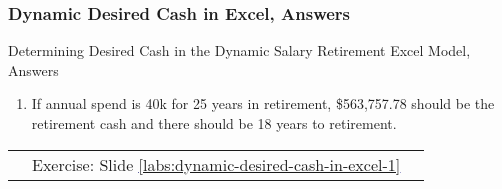 \documentclass[handout, 11pt]{beamer}
\begin{document}
\appendix
{}
\setcounter{finalframe}{\value{framenumber}}
\begin{frame}
\frametitle{Dynamic Desired Cash in Excel, Answers}
{
\begin{block}{Determining Desired Cash in the Dynamic Salary Retirement Excel Model, Answers}
\begin{enumerate}
\item If annual spend is 40k for 25 years in retirement, \$563,757.78 should be the retirement cash and there should be 18 years to retirement.
\end{enumerate}
\vfill
\begin{tabular*}{\textwidth}{@{\extracolsep{\fill}}ccc}
\toprule
\hfill & Exercise: Slide \textcolor{blue}{\underline{\ref{labs:dynamic-desired-cash-in-excel-1}}} & \hfill\\

\end{tabular*}
\end{block}
}
\label{labs:dynamic-desired-cash-in-excel-1-answers}
\end{frame}
\setcounter{framenumber}{\value{finalframe}}
\end{document}
